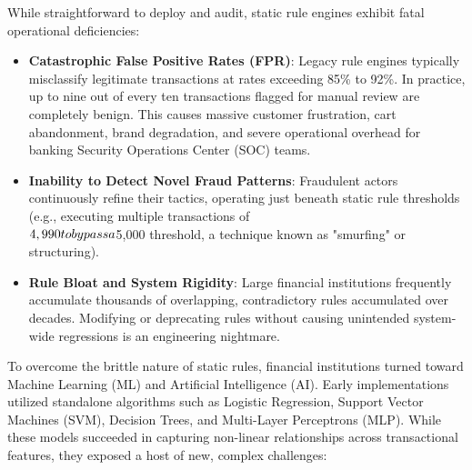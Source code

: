 \documentclass[12pt,a4paper,oneside]{report}
\begin{document}
While straightforward to deploy and audit, static rule engines exhibit fatal operational deficiencies:

\begin{itemize}[leftmargin=0.35in]
\item \textbf{Catastrophic False Positive Rates (FPR)}: Legacy rule engines typically misclassify legitimate transactions at rates exceeding 85\% to 92\%. In practice, up to nine out of every ten transactions flagged for manual review are completely benign. This causes massive customer frustration, cart abandonment, brand degradation, and severe operational overhead for banking Security Operations Center (SOC) teams.
\item \textbf{Inability to Detect Novel Fraud Patterns}: Fraudulent actors continuously refine their tactics, operating just beneath static rule thresholds (e.g., executing multiple transactions of \\$4,990 to bypass a \\$5,000 threshold, a technique known as "smurfing" or structuring).
\item \textbf{Rule Bloat and System Rigidity}: Large financial institutions frequently accumulate thousands of overlapping, contradictory rules accumulated over decades. Modifying or deprecating rules without causing unintended system-wide regressions is an engineering nightmare.
\end{itemize}

To overcome the brittle nature of static rules, financial institutions turned toward Machine Learning (ML) and Artificial Intelligence (AI). Early implementations utilized standalone algorithms such as Logistic Regression, Support Vector Machines (SVM), Decision Trees, and Multi-Layer Perceptrons (MLP). While these models succeeded in capturing non-linear relationships across transactional features, they exposed a host of new, complex challenges:
\end{document}
